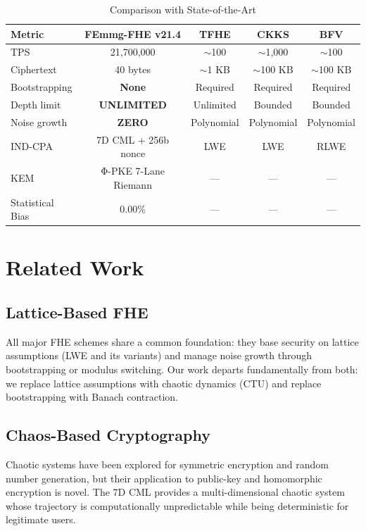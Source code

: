 \documentclass[11pt,a4paper]{article}
\begin{document}
\begin{table}[h]
\centering
\begin{tabular}{|l|c|c|c|c|}
\hline
\textbf{Metric} & \textbf{FEmmg-FHE v21.4} & \textbf{TFHE} & \textbf{CKKS} & \textbf{BFV} \\
\hline
TPS & 21,700,000 & $\sim$100 & $\sim$1,000 & $\sim$100 \\
Ciphertext & 40 bytes & $\sim$1 KB & $\sim$100 KB & $\sim$100 KB \\
Bootstrapping & \textbf{None} & Required & Required & Required \\
Depth limit & \textbf{UNLIMITED} & Unlimited & Bounded & Bounded \\
Noise growth & \textbf{ZERO} & Polynomial & Polynomial & Polynomial \\
IND-CPA & 7D CML + 256b nonce & LWE & LWE & RLWE \\
KEM & Φ-PKE 7-Lane Riemann & — & — & — \\
Statistical Bias & 0.00\% & — & — & — \\
\hline
\end{tabular}
\caption{Comparison with State-of-the-Art}
\end{table}

\section{Related Work}

\subsection{Lattice-Based FHE}
All major FHE schemes share a common foundation: they base security on lattice assumptions (LWE and its variants) and manage noise growth through bootstrapping or modulus switching. Our work departs fundamentally from both: we replace lattice assumptions with chaotic dynamics (CTU) and replace bootstrapping with Banach contraction.

\subsection{Chaos-Based Cryptography}
Chaotic systems have been explored for symmetric encryption and random number generation, but their application to public-key and homomorphic encryption is novel. The 7D CML provides a multi-dimensional chaotic system whose trajectory is computationally unpredictable while being deterministic for legitimate users.
\end{document}
